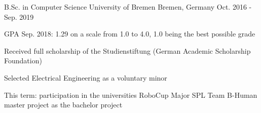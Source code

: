

\begin{cventries}

  \cventry
    {B.Sc. in Computer Science} %
    {University of Bremen} %
    {Bremen, Germany} %
    {Oct. 2016 - Sep. 2019} %
    {
      \begin{cvitems} %
        \item {GPA Sep. 2018: 1.29 on a scale from 1.0 to 4.0, 1.0 being the best possible grade}
        \item {Received full scholarship of the Studienstiftung (German Academic Scholarship Foundation)}
        \item {Selected Electrical Engineering as a voluntary minor}
        \item {This term: participation in the universities RoboCup Major SPL Team B-Human master project as the bachelor project}        
      \end{cvitems}
    }

\end{cventries}
